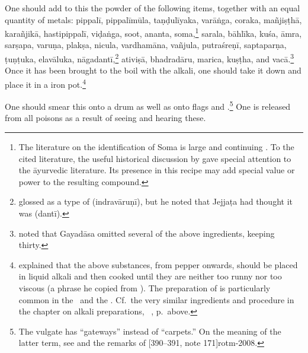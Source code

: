 \begin{translation}
One should add to this the powder of the following items, together
with an equal quantity of metals: \gls{pippalī}, \gls{pippalīmūla},
\gls{taṇḍulīyaka}, \gls{varāṅga}, \gls{coraka}, \gls{mañjiṣṭhā},
\gls{karañjikā}, \gls{hastipippalī}, \gls{viḍaṅga},
soot, \gls{ananta}, soma,\footnote{The
    literature on the identification of Soma is large and continuing
    \parencites[76--78, 125--131]{wuja-2003}{clar-2017}. To the cited
    literature, the useful historical discussion by
    \citet[449--455]{gvdb} gave special attention to the āyurvedic
    literature.  Its presence in this recipe may add special value or
    power to the resulting compound.} \gls{sarala}, \gls{bāhlīka},
    \gls{kuśa}, \gls{āmra}, \gls{sarṣapa}, \gls{varuṇa}, \gls{plakṣa},
    \gls{nicula}, \gls{vardhamāna}, \gls{vañjula}, \gls{putraśreṇī},
    \gls{saptaparṇa}, \gls{ṭuṇṭuka}, \gls{elavāluka},
    \gls{nāgadantī},\footnote{ glossed
         as a type of  (\gls{indravāruṇī}),
        but he noted that Jejjaṭa had thought it was 
        (\gls{dantī}).} \gls{ativiṣā}, \gls{bhadradāru}, \gls{marica},
        \gls{kuṣṭha}, and \gls{vacā}.\footnote{ noted
            that Gayadāsa omitted several of the above ingredients, keeping
            thirty.}  Once it has been brought to the boil with the alkali, one
            should take it down and place it in a iron
            pot.\footnote{\label{kṣārapāka2} explained 
            that
                the above substances, from pepper onwards, should be placed in 
                liquid
                alkali and then cooked until they are neither too runny nor too
                viscous (a phrase he copied from ).  The 
                preparation
                of  is particularly common in the \SS\ and the \AH.  Cf.\
                the very similar ingredients and procedure in the chapter on alkali
                preparations, \SS\ \Su{1.11.11}{46--47}, p.\,\pageref{kṣārapāka}
                above.}
                
\item[4]    

One should smear this onto a drum as well as onto flags and
.\footnote{The vulgate has  “gateways”
    instead of \dev{āstaraṇa} “carpets.”  On the meaning of the latter
    term, see \cite[31, 33 \emph{et passim}]{bail-1970} and the remarks
   of \tvolcite{1}[390--391, note 171]{rotm-2008}.} One is released
    from all poisons as a result of seeing and hearing these.


\end{translation}
